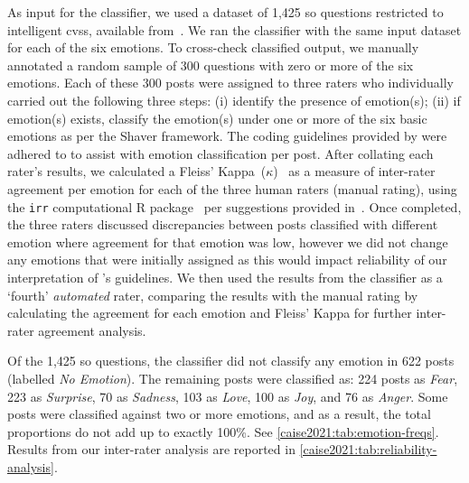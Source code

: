 As input for the classifier, we used a dataset of 1,425 \gls{so} questions restricted to intelligent \glspl{cvs}, available from~\citet{Cummaudo:2020icse}.  We ran the classifier with the same input dataset for each of the six emotions.
To cross-check classified output, we manually annotated a random sample of 300 questions with zero or more of the six emotions. Each of these 300 posts were assigned to three raters who individually carried out the following three steps: (i) identify the presence of emotion(s); (ii) if emotion(s) exists, classify the emotion(s) under one or more of the six basic emotions as per the Shaver framework. The coding guidelines provided by \citet{novielli2018} were adhered to to assist with emotion classification per post.  After collating each rater's results, we calculated a Fleiss' Kappa~($\kappa$)~\citep{Fleiss:1971ff} as a measure of inter-rater agreement per emotion for each of the three human raters (manual rating), using the \texttt{irr} computational R package~\citep{Gamer:tj} per suggestions provided in~\citep{Hallgren:2012kt}. Once completed, the three raters discussed discrepancies between posts classified with different emotion where agreement for that emotion was low, however we did not change any emotions that were initially assigned as this would impact reliability of our interpretation of \citet{novielli2018}'s guidelines. We then used the results from the classifier as a `fourth' \textit{automated} rater, comparing the results with the manual rating by calculating the agreement for each emotion and Fleiss' Kappa for further inter-rater agreement analysis.

Of the 1,425 \gls{so} questions, the classifier did not classify any emotion in 622 posts (labelled \textit{No Emotion}). The remaining posts were classified as: 224 posts as \textit{Fear}, 223 as \textit{Surprise}, 70 as \textit{Sadness}, 103 as \textit{Love}, 100 as \textit{Joy}, and 76 as \textit{Anger}. Some posts were classified against two or more emotions, and as a result, the total proportions do not add up to exactly 100\%. See \cref{caise2021:tab:emotion-freqs}.  Results from our inter-rater analysis are reported in \cref{caise2021:tab:reliability-analysis}.


